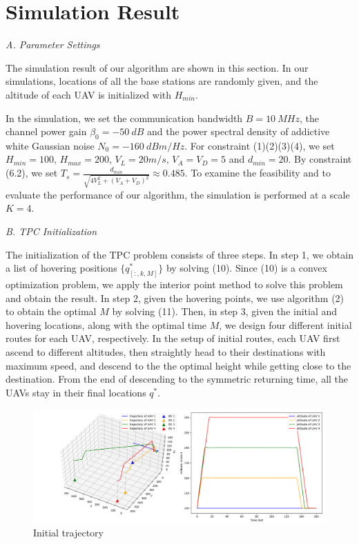 \documentclass[10pt,final,conference]{IEEEtran}
\begin{document}
\section{Simulation Result}\label{V}
\textit{A. Parameter Settings} \par
The simulation result of our algorithm are shown in this section. In our simulations, locations of all the base stations are randomly given, and the altitude of each UAV is initialized with $H_{min}$. \par 
In the simulation, we set the communication bandwidth $B = \SI{10}{MHz}$, the channel power gain $\beta_0 = \SI{-50}{dB}$ and the power spectral density of addictive white Gaussian noise $N_0 = \SI{-160}{dBm/Hz}$. For constraint (1)(2)(3)(4), we set $H_{min} = 100$, $H_{max} = 200$, $V_L = 20 m/s$, $V_A = V_D = 5$ and $d_{min} = 20$. By constraint (6.2), we set $T_s = \frac{d_{min}}{\sqrt{4V_L^2 + (V_A + V_D) ^ 2}} \approx 0.485$. To examine the feasibility and to evaluate the performance of our algorithm, the simulation is performed at a scale $K = 4$. \\\par 
\textit{B. TPC Initialization} \par
The initialization of the TPC problem consists of three steps. In step 1, we obtain a list of hovering positions $\{q_{[:, k, M]}^*\}$ by solving (10). Since (10) is a convex optimization problem, we apply the interior point method to solve this problem and obtain the result. In step 2, given the hovering points, we use algorithm (2) to obtain the optimal $M$ by solving (11). Then, in step 3, given the initial and hovering locations, along with the optimal time $M$, we design four different initial routes for each UAV, respectively. In the setup of initial routes, each UAV first ascend to different altitudes, then straightly head to their destinations with maximum speed, and descend to the the optimal height while getting close to the destination. From the end of descending to the symmetric returning time, all the UAVs stay in their final locations $q^*$. 
\begin{figure}[H]
	\includegraphics[width=\linewidth]{init_trajectory.png}
	\caption{Initial trajectory}
\end{figure}
\end{document}
